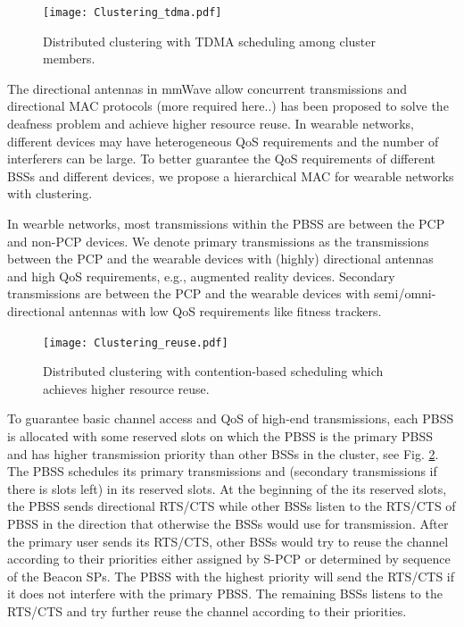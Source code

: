 \documentclass[10pt, conference, letterpaper]{IEEEtran}
\begin{document}
\begin{figure}
	\centering
	\texttt{[image: Clustering\_tdma.pdf]}
	\caption{Distributed clustering with TDMA scheduling among cluster members.}
	\label{fig:clustering:tdma}
\end{figure}

The directional antennas in mmWave allow concurrent transmissions and directional MAC protocols \cite{cocurrentbf}(more required here..) has been proposed to solve the deafness problem and achieve higher resource reuse. In wearable networks, different devices may have heterogeneous QoS requirements and the number of interferers can be large. To better guarantee the QoS requirements of different BSSs and different devices, we propose a hierarchical MAC for wearable networks with clustering.

In wearble networks, most transmissions within the PBSS are between the PCP and non-PCP devices. We denote primary transmissions as the transmissions between the PCP and the wearable devices with (highly) directional antennas and high QoS requirements, e.g., augmented reality devices. Secondary transmissions are between the PCP and the wearable devices with semi/omni-directional antennas with low QoS requirements like fitness trackers. 

\begin{figure}
	\centering
	\texttt{[image: Clustering\_reuse.pdf]}
	\caption{Distributed clustering  with contention-based scheduling which achieves higher resource reuse.}
	\label{fig:clustering:reuse}
\end{figure}

To guarantee basic channel access and QoS of high-end transmissions, each PBSS is allocated with some reserved slots on which the PBSS is the primary PBSS and has higher transmission priority than other BSSs in the cluster, see Fig. \ref{fig:clustering:reuse}. The PBSS schedules its primary transmissions and (secondary transmissions if there is slots left) in its reserved slots. At the beginning of the its reserved slots, the PBSS sends directional RTS/CTS while other BSSs listen to the RTS/CTS of PBSS in the direction that otherwise the BSSs would use for transmission. After the primary user sends its RTS/CTS, other BSSs would try to reuse the channel according to their priorities either assigned by S-PCP or determined by sequence of the Beacon SPs. The PBSS with the highest priority will send the RTS/CTS if it does not interfere with the primary PBSS. The remaining BSSs listens to the RTS/CTS and try further reuse the channel according to their priorities. 
\end{document}
